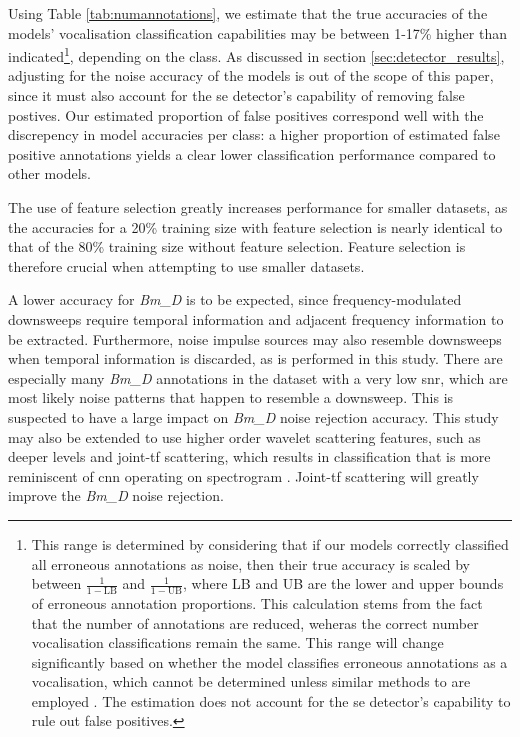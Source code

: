 {Using Table \ref{tab:numannotations}, we estimate that the true accuracies of the models' vocalisation classification capabilities may be between 1-17\% higher than indicated\footnote{This range is determined by considering that if our models correctly classified all erroneous annotations as noise, then their true accuracy is scaled by between $\frac{1}{1-\text{LB}}$ and $\frac{1}{1-\text{UB}}$, where LB and UB are the lower and upper bounds of erroneous annotation proportions. This calculation stems from the fact that the number of annotations are reduced, weheras the correct number vocalisation classifications remain the same. This range will change significantly based on whether the model classifies erroneous annotations as a vocalisation, which cannot be determined unless similar methods to \citet{casey2019} are employed . The estimation does not account for the \ac{se} detector's capability to rule out false positives.}, depending on the class. As discussed in section \ref{sec:detector_results}, adjusting for the noise accuracy of the models is out of the scope of this paper, since it must also account for the \ac{se} detector's capability of removing false postives. Our estimated proportion of false positives correspond well with the discrepency in model accuracies per class: a higher proportion of estimated false positive annotations yields a clear lower classification performance compared to other models. 

The use of feature selection greatly increases performance for smaller datasets, as the accuracies for a 20\% training size with feature selection is nearly identical to that of the 80\% training size without feature selection. Feature selection is therefore crucial when attempting to use smaller datasets.

A lower accuracy for \textit{Bm\_D} is to be expected, since frequency-modulated downsweeps require temporal information and adjacent frequency information to be extracted. Furthermore, noise impulse sources may also resemble downsweeps when temporal information is discarded, as is performed in this study. There are especially many \textit{Bm\_D} annotations in the dataset with a very low \ac{snr}, which are most likely noise patterns that happen to resemble a downsweep. This is suspected to have a large impact on \textit{Bm\_D} noise rejection accuracy. This study may also be extended to use higher order wavelet scattering features, such as deeper levels and joint-\ac{tf} scattering, which results in classification that is more reminiscent of \ac{cnn} operating on spectrogram \citep{ws_joint_tf}. Joint-\ac{tf} scattering will greatly improve the \textit{Bm\_D} noise rejection.

}
